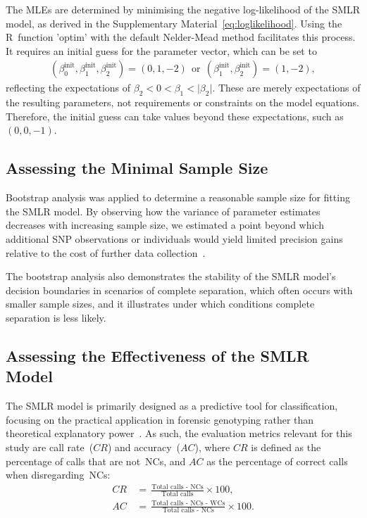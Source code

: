 \documentclass[preprint,5p,times,11pt]{elsarticle}
\begin{document}
The MLEs are determined by minimising the negative log-likelihood of the SMLR model, as derived in the Supplementary Material~\eqref{eq:loglikelihood}.
Using the R~function 'optim' with the default Nelder-Mead method facilitates this process.
It requires an initial guess for the parameter vector, which can be set to
\begin{align*}
\left(\beta_0^{\text{init}}, \beta_1^{\text{init}}, \beta_2^{\text{init}}\right)
=
\left(0, 1, -2\right)
\ \ \text{or} \ \ 
\left(\beta_1^{\text{init}}, \beta_2^{\text{init}}\right)
=
\left(1, -2\right),
\end{align*}
reflecting the expectations of $\beta_2 < 0 < \beta_1 < \lvert \beta_2 \rvert$.
These are merely expectations of the resulting parameters, not requirements or constraints on the model equations.
Therefore, the initial guess can take values beyond these expectations, such as $(0, 0, -1)$.


\subsection{Assessing the Minimal Sample Size}
Bootstrap analysis was applied to determine a reasonable sample size for fitting the SMLR model.
By observing how the variance of parameter estimates decreases with increasing sample size, we estimated a point beyond which additional SNP observations or individuals would yield limited precision gains relative to the cost of further data collection~\cite{efron}.

The bootstrap analysis also demonstrates the stability of the SMLR model's decision boundaries in scenarios of complete separation, which often occurs with smaller sample sizes, and it illustrates under which conditions complete separation is less likely.


\subsection{Assessing the Effectiveness of the SMLR Model}
The SMLR model is primarily designed as a predictive tool for classification, focusing on the practical application in forensic genotyping rather than theoretical explanatory power~\cite{shmueli}.
As such, the evaluation metrics relevant for this study are call rate~($CR$) and accuracy~($AC$), where $CR$ is defined as the percentage of calls that are not~NCs, and $AC$ as the percentage of correct calls when disregarding~NCs:
\begin{align*}
CR \, &= \, \frac{\text{Total calls - NCs}}{\text{Total calls}} \times 100, \\
AC \, &= \, \frac{\text{Total calls - NCs - WCs}}{\text{Total calls - NCs}} \times 100.
\end{align*}
\end{document}
